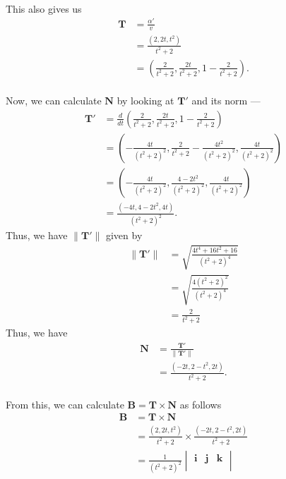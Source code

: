 \documentclass[12 pt, letterpaper]{hmcpset}
\begin{document}
\begin{solution}
\begin{enumerate}
\[\begin{split}
				\end{split}
			\]
			This also gives us
			\[
				\begin{split}
					\mathbf{T} & = \frac{\alpha'}{v} \\
						   & = \frac{(2, 2t, t^{2})}{t^{2} + 2} \\
						   & = \left ( \frac{2}{t^{2} + 2}, \frac{2t}{t^{2} + 2}, 1 - \frac{2}{t^{2} + 2} \right ).
				\end{split}
			\] \\
			Now, we can calculate $\mathbf{N}$ by looking at $\mathbf{T}'$ and its norm ---
			\[
				\begin{split}
					\mathbf{T}' & = \frac{d}{dt} \left ( \frac{2}{t^{2} + 2}, \frac{2t}{t^{2} + 2}, 1 - \frac{2}{t^{2} + 2} \right ) \\
						    & = \left ( - \frac{4t}{(t^{2} + 2)^{2}}, \frac{2}{t^{2} + 2} - \frac{4t^{2}}{(t^{2} + 2)^{2}}, \frac{4t}{(t^{2} + 2)^{2}} \right ) \\
						    & = \left ( - \frac{4t}{(t^{2} + 2)^{2}}, \frac{4 - 2t^{2}}{(t^{2} + 2)^{2}}, \frac{4t}{(t^{2} + 2)^{2}} \right ) \\
						    & = \frac{(-4t, 4 - 2t^{2}, 4t)}{(t^{2} + 2)^{2}}.
				\end{split}
			\]
			Thus, we have $\lVert \mathbf{T}' \rVert$ given by
			\[
				\begin{split}
					\lVert \mathbf{T}' \rVert & = \sqrt{\frac{4t^{4} + 16t^{2} + 16}{(t^{2} + 2)^{4}}} \\
								 & = \sqrt{\frac{4(t^{2} + 2)^{2}}{(t^{2} + 2)^{4}}} \\
								 & = \frac{2}{t^{2} + 2}
				\end{split}
			\]
			Thus, we have
			\[
				\begin{split}
					\mathbf{N} & = \frac{\mathbf{T}'}{\lVert \mathbf{T}' \rVert} \\
						   & = \frac{(-2t, 2 - t^{2}, 2t)}{t^{2} + 2}.
				\end{split}
			\] \\
			From this, we can calculate $\mathbf{B} = \mathbf{T} \times \mathbf{N}$ as follows 
			\[
				\begin{split}
					\mathbf{B} & = \mathbf{T} \times \mathbf{N} \\
						   & = \frac{(2, 2t, t^{2})}{t^{2} + 2} \times \frac{(-2t, 2 - t^{2}, 2t)}{t^{2} + 2} \\
						   & = \frac{1}{(t^{2} + 2)^{2}}
						   \begin{vmatrix}
							   \mathbf{i} & \mathbf{j} & \mathbf{k} \\

\end{vmatrix}
\end{split}\]
\end{enumerate}
\end{solution}
\end{document}
